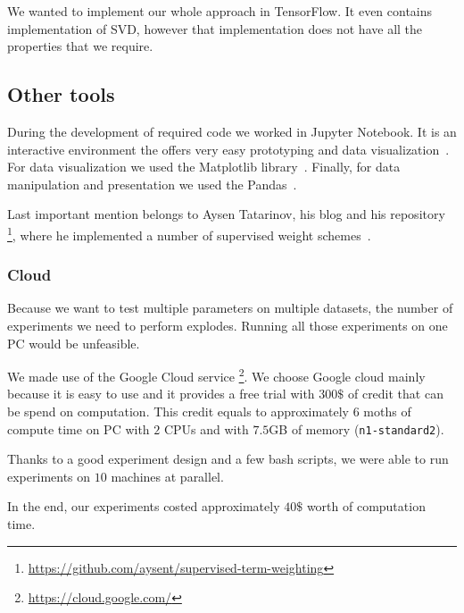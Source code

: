     We wanted to implement our whole approach in TensorFlow.
    It even contains implementation of SVD, however that implementation does not have all the properties that we require.
    
    \subsection{Other tools}
    
    During the development of required code we worked in Jupyter Notebook. 
    It is an interactive environment the offers very easy prototyping and
    data visualization~\cite{PER-GRA:2007}. %
    For data visualization we used the Matplotlib library~\cite{hunter2007matplotlib}. %
    Finally, for data manipulation and presentation we used the Pandas~\cite{mckinney2010data}. %
    
    Last important mention belongs to Aysen Tatarinov, his blog and his repository \footnote{\url{https://github.com/aysent/supervised-term-weighting}}, where he implemented a number of supervised weight schemes~\cite{maas2011learning}.
    
    
    \subsubsection{Cloud} 
    Because we want to test multiple parameters on multiple datasets, the number of experiments we need to perform explodes.
    Running all those experiments on one PC would be unfeasible.
    
    We made use of the Google Cloud service \footnote{\url{https://cloud.google.com/}}.
    We choose Google cloud mainly because it is easy to use and it provides a free trial with $300\$$ of credit that can be spend on computation. 
    This credit equals to approximately $6$ moths of compute time on PC with $2$ CPUs and with $7.5$GB of memory (\texttt{n1-standard2}).
    
    Thanks to a good experiment design and a few bash scripts,
    we were able to run experiments on $10$ machines at parallel.
    
    
    In the end, our experiments costed approximately $40\$$ worth of computation time.
    
